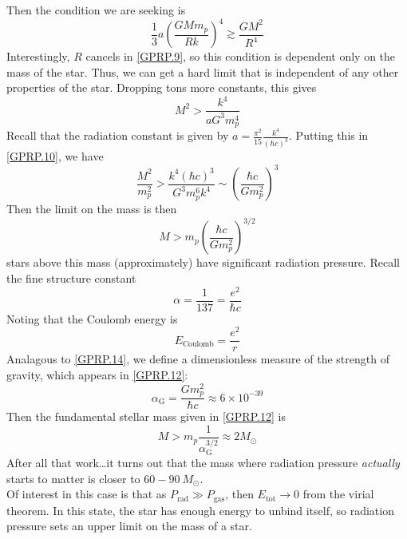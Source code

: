 \documentclass[10pt]{article}
\numberwithin{equation}{section}
\newcommand{\n}{\noindent}
\begin{document}
		Then the condition we are seeking is
		\begin{equation}
			\label{GPRP.9} \frac{1}{3}a\left(\frac{GMm_p}{Rk}\right)^4\gtrsim\frac{GM^2}{R^4}
		\end{equation}
		Interestingly, $R$ cancels in \eqref{GPRP.9}, so this condition is dependent only on the mass of the star. Thus, we can get a hard limit that is independent of any other properties of the star. Dropping tons more constants, this gives
		\begin{equation}
			\label{GPRP.10} M^2>\frac{k^4}{a G^3m_p^4}
		\end{equation}
		Recall that the radiation constant is given by $a=\frac{\pi^2}{15}\frac{k^4}{(\hbar c)^3}$. Putting this in \eqref{GPRP.10}, we have
		\begin{equation}
			\label{GPRP.11} \frac{M^2}{m_p^2}>\frac{k^4(\hbar c)^3}{G^3m_p^6 k^4}\sim\left(\frac{\hbar c}{G m_p^2}\right)^3
		\end{equation}
		Then the limit on the mass is then
		\begin{equation}
			\label{GPRP.12}\boxed{ M>m_p\left(\frac{\hbar c}{Gm_p^2}\right)^{3/2}}
		\end{equation}
		stars above this mass (approximately) have significant radiation pressure. Recall the fine structure constant
		\begin{equation}
			\label{GPRP.13} \alpha=\frac{1}{137} =\frac{e^2}{\hbar c}
		\end{equation}
		Noting that the Coulomb energy is
		\begin{equation}
			\label{GPRP.14} E_{\mathrm{Coulomb}}=\frac{e^2}{r}
		\end{equation}
		Analagous to \eqref{GPRP.14}, we define a
                dimensionless measure of the strength of gravity,
                which appears in \eqref{GPRP.12}:
		\begin{equation}
			\label{GPRP.15} \alpha_\mathrm{G}=\frac{Gm_p^2}{\hbar c}\approx 6\times 10^{-39}
		\end{equation}
		Then the fundamental stellar mass given in \eqref{GPRP.12} is
		\begin{equation}
			\label{GPRP.16} M>m_p\frac{1}{\alpha_{\mathrm{G}}^{3/2}}\approx 2M_\odot
		\end{equation}
		After all that work\ldots it turns out that the mass where radiation pressure \emph{actually} starts to matter is closer to $60-90\ M_\odot$.\\
		
		\n Of interest in this case is that as $P_{\mathrm{rad}}\gg P_{\mathrm{gas}}$, then $E_{\mathrm{tot}}\to 0$ from the virial theorem. In this state, the star has enough energy to unbind itself, so radiation pressure sets an upper limit on the mass of a star.
\end{document}
